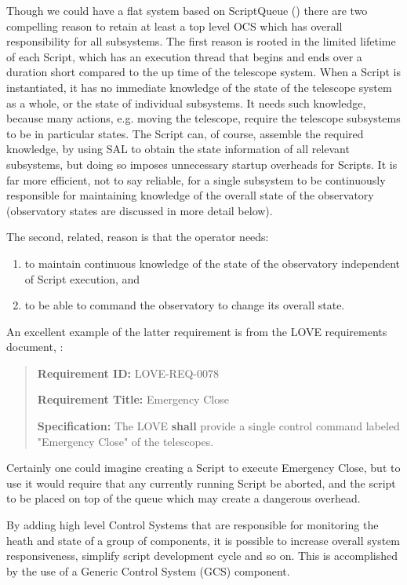 Though we could have a flat system based on ScriptQueue () there are two compelling reason to retain at least a top level OCS which has overall responsibility for all subsystems. The first reason is rooted in the limited lifetime of each Script, which has an execution thread that begins and ends over a duration short compared to the up time of the telescope system. When a Script is instantiated, it has no immediate knowledge of the state of the telescope system as a whole, or the state of individual subsystems. It needs such knowledge, because many actions, e.g. moving the telescope, require the telescope subsystems to be in particular states. The Script can, of course, assemble the required knowledge, by using SAL to obtain the state information of all relevant subsystems, but doing so imposes unnecessary startup overheads for Scripts. It is far more efficient, not to say reliable, for a single subsystem to be continuously responsible for maintaining knowledge of the overall state of the observatory (observatory states are discussed in more detail below).

The second, related, reason is that the operator needs:
\begin{enumerate}
\item to maintain continuous knowledge of the state of the observatory independent of Script execution, and
\item  to be able to command the observatory to change its overall state.
\end{enumerate}
An excellent example of the latter requirement is from the LOVE requirements document, :

\begin{quotation}
{\bf Requirement ID:} LOVE-REQ-0078

{\bf Requirement Title:} Emergency Close 

{\bf Specification:} The LOVE {\bf shall} provide a single control command labeled "Emergency Close" of the telescopes. 
\end{quotation}

Certainly one could imagine creating a Script to execute Emergency Close, but to use it would require that any currently running Script be aborted, and the script to be placed on top of the queue which may create a dangerous overhead.

By adding high level Control Systems that are responsible for monitoring the heath and state of a group of components, it is possible to increase overall system responsiveness, simplify script development cycle and so on. This is accomplished by the use of a Generic Control System (GCS) component.

